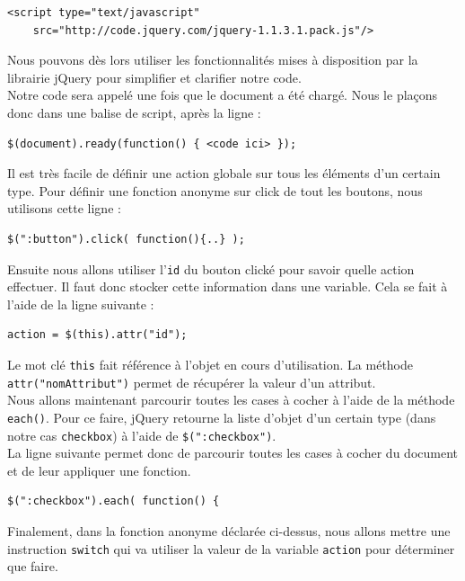 \documentclass[10pt,a4paper,titlepage]{article}
\begin{document}
\begin{lstlisting}
<script type="text/javascript" 
	src="http://code.jquery.com/jquery-1.1.3.1.pack.js"/>
\end{lstlisting}

Nous pouvons dès lors utiliser les fonctionnalités mises à disposition par la librairie jQuery pour simplifier et clarifier notre code. \\

Notre code sera appelé une fois que le document a été chargé. Nous le plaçons donc dans une balise de script, après la ligne :

\begin{lstlisting}
$(document).ready(function() { <code ici> });
\end{lstlisting}

Il est très facile de définir une action globale sur tous les éléments d'un certain type. Pour définir une fonction anonyme sur click de tout les boutons, nous utilisons cette ligne :

\begin{lstlisting}
$(":button").click( function(){..} );
\end{lstlisting}

Ensuite nous allons utiliser l'\texttt{id} du bouton clické pour savoir quelle action effectuer. Il faut donc stocker cette information dans une variable. Cela se fait à l'aide de la ligne suivante :

\begin{lstlisting}
action = $(this).attr("id");
\end{lstlisting}

Le mot clé \texttt{this} fait référence à l'objet en cours d'utilisation. La méthode \texttt{attr("nomAttribut")} permet de récupérer la valeur d'un attribut. \\

Nous allons maintenant parcourir toutes les cases à cocher à l'aide de la méthode \texttt{each()}. Pour ce faire, jQuery retourne la liste d'objet d'un certain type (dans notre cas \texttt{checkbox}) à l'aide de \verb!$(":checkbox")!.  \\ 

La ligne suivante permet donc de parcourir toutes les cases à cocher du document et de leur appliquer une fonction.

\begin{lstlisting}
$(":checkbox").each( function() {
\end{lstlisting}

Finalement, dans la fonction anonyme déclarée ci-dessus, nous allons mettre une instruction \texttt{switch} qui va utiliser la valeur de la variable \texttt{action} pour déterminer que faire.\\
\end{document}
